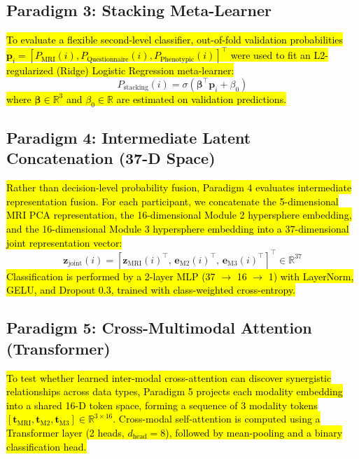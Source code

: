 \documentclass[10pt,letterpaper]{article}
\begin{document}
        \subsection*{Paradigm 3: Stacking Meta-Learner}
        \hl{To evaluate a flexible second-level classifier, out-of-fold validation probabilities $\mathbf{p}_i = [P_{\text{MRI}}(i), P_{\text{Questionnaire}}(i), P_{\text{Phenotypic}}(i)]^\top$ were used to fit an L2-regularized (Ridge) Logistic Regression meta-learner:}
        \begin{equation} \label{eq:stacking}
        P_{\text{stacking}}(i) = \sigma(\boldsymbol{\beta}^\top \mathbf{p}_i + \beta_0)
        \end{equation}
        \hl{where $\boldsymbol{\beta} \in \mathbb{R}^3$ and $\beta_0 \in \mathbb{R}$ are estimated on validation predictions.}

        \subsection*{Paradigm 4: Intermediate Latent Concatenation (37-D Space)}
        \hl{Rather than decision-level probability fusion, Paradigm 4 evaluates intermediate representation fusion. For each participant, we concatenate the 5-dimensional MRI PCA representation, the 16-dimensional Module 2 hypersphere embedding, and the 16-dimensional Module 3 hypersphere embedding into a 37-dimensional joint representation vector:}
        \begin{equation} \label{eq:latent_concat}
        \mathbf{z}_{\text{joint}}(i) = [\mathbf{z}_{\text{MRI}}(i)^\top,\, \mathbf{e}_{\text{M2}}(i)^\top,\, \mathbf{e}_{\text{M3}}(i)^\top]^\top \in \mathbb{R}^{37}
        \end{equation}
        \hl{Classification is performed by a 2-layer MLP (37 $\to$ 16 $\to$ 1) with LayerNorm, GELU, and Dropout 0.3, trained with class-weighted cross-entropy.}

        \subsection*{Paradigm 5: Cross-Multimodal Attention (Transformer)}
        \hl{To test whether learned inter-modal cross-attention can discover synergistic relationships across data types, Paradigm 5 projects each modality embedding into a shared 16-D token space, forming a sequence of 3 modality tokens $[\mathbf{t}_{\text{MRI}}, \mathbf{t}_{\text{M2}}, \mathbf{t}_{\text{M3}}] \in \mathbb{R}^{3 \times 16}$. Cross-modal self-attention is computed using a Transformer layer (2 heads, $d_{\text{head}} = 8$), followed by mean-pooling and a binary classification head.}
\end{document}
